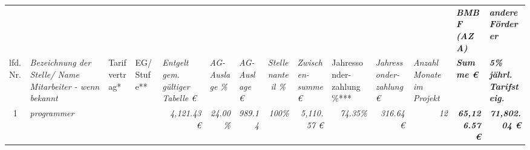 \begin{table}[]
\begin{tabular}{cllllrrrrrrrrrr}
\rowcolor[HTML]{C6D9F1} 
\multicolumn{1}{l}{\cellcolor[HTML]{C6D9F1}\textbf{2028}}                               & \multicolumn{2}{l}{\cellcolor[HTML]{C6D9F1}\textit{}}                                                        &                                       &                                              & \multicolumn{1}{l}{\cellcolor[HTML]{C6D9F1}\textit{}}                                & \multicolumn{1}{l}{\cellcolor[HTML]{C6D9F1}\textit{}}     & \multicolumn{1}{l}{\cellcolor[HTML]{C6D9F1}\textit{}}    & \multicolumn{1}{l}{\cellcolor[HTML]{C6D9F1}\textit{}}                 & \multicolumn{1}{l}{\cellcolor[HTML]{C6D9F1}\textit{}}                 & \multicolumn{1}{l}{\cellcolor[HTML]{C6D9F1}\textit{}}                  & \multicolumn{1}{l}{\cellcolor[HTML]{C6D9F1}\textit{}}                       & \multicolumn{1}{l}{\cellcolor[HTML]{C6D9F1}\textit{}}                         & \multicolumn{1}{l}{\cellcolor[HTML]{92D050}\textit{\textbf{BMBF (AZA)}}} & \multicolumn{1}{l}{\cellcolor[HTML]{92D050}\textit{\textbf{andere Förderer}}}        \\
\multicolumn{1}{l}{lfd. Nr.}                                                            & \multicolumn{2}{l}{\cellcolor[HTML]{FFFF99}\textit{Bezeichnung der Stelle/ Name Mitarbeiter - wenn bekannt}} & \cellcolor[HTML]{FFFF99}Tarifvertrag* & \cellcolor[HTML]{FFFF99}EG/ Stufe**          & \multicolumn{1}{l}{\cellcolor[HTML]{FFFF99}\textit{Entgelt gem. gültiger Tabelle €}} & \multicolumn{1}{l}{\textit{AG-Auslage \%}}                & \multicolumn{1}{l}{\textit{AG-Auslage €}}                & \multicolumn{1}{c}{\cellcolor[HTML]{FFFF99}\textit{Stellenanteil \%}} & \multicolumn{1}{l}{\cellcolor[HTML]{92D050}\textit{Zwischen-summe €}} & \multicolumn{1}{l}{Jahressonder-zahlung \%***}                         & \multicolumn{1}{l}{\cellcolor[HTML]{92D050}\textit{Jahressonder-zahlung €}} & \multicolumn{1}{l}{\cellcolor[HTML]{FFFF99}\textit{Anzahl Monate im Projekt}} & \multicolumn{1}{l}{\cellcolor[HTML]{BFBFBF}\textit{\textbf{Summe €}}}    & \multicolumn{1}{l}{\textit{\textbf{5\% jährl. Tarifsteig.}}}                         \\
1                                                                                       & \multicolumn{2}{l}{\cellcolor[HTML]{FFFF99}\textit{programmer}}                                              & \cellcolor[HTML]{FFFF99}              & \cellcolor[HTML]{FFFF99}                     & \cellcolor[HTML]{FFFF99}\textit{4,121.43 €}                                          & \textit{24.00\%}                                          & \textit{989.14}                                          & \cellcolor[HTML]{FFFF99}\textit{100\%}                                & \cellcolor[HTML]{92D050}\textit{5,110.57 €}                           & \cellcolor[HTML]{FFFF99}\textit{74.35\%}                               & \cellcolor[HTML]{92D050}\textit{316.64 €}                                   & \cellcolor[HTML]{FFFF99}\textit{12}                                           & \cellcolor[HTML]{BFBFBF}\textit{\textbf{65,126.57 €}}                    & \textit{\textbf{71,802.04 €}}                                                        \\

\end{tabular}
\end{table}
